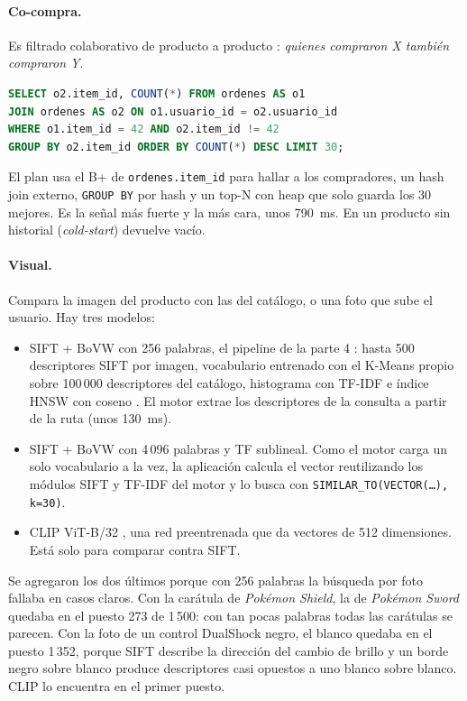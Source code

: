 \paragraph{Co-compra.} Es filtrado colaborativo de producto a producto \citep{linden}: \emph{quienes compraron X también compraron Y}.
\begin{lstlisting}[language=SQL]
SELECT o2.item_id, COUNT(*) FROM ordenes AS o1
JOIN ordenes AS o2 ON o1.usuario_id = o2.usuario_id
WHERE o1.item_id = 42 AND o2.item_id != 42
GROUP BY o2.item_id ORDER BY COUNT(*) DESC LIMIT 30;
\end{lstlisting}
El plan usa el B+ de \texttt{ordenes.item\_id} para hallar a los compradores, un hash join externo, \texttt{GROUP BY} por hash y un top-N con heap que solo guarda los 30 mejores. Es la señal más fuerte y la más cara, unos 790~ms. En un producto sin historial (\emph{cold-start}) devuelve vacío.

\paragraph{Visual.} Compara la imagen del producto con las del catálogo, o una foto que sube el usuario. Hay tres modelos:
\begin{itemize}
  \item SIFT + BoVW con 256 palabras, el pipeline de la parte 4 \citep{lowe,sivic}: hasta 500 descriptores SIFT por imagen, vocabulario entrenado con el K-Means propio sobre 100\,000 descriptores del catálogo, histograma con TF-IDF e índice HNSW con coseno \citep{hnsw}. El motor extrae los descriptores de la consulta a partir de la ruta (unos 130~ms).
  \item SIFT + BoVW con 4\,096 palabras y TF sublineal. Como el motor carga un solo vocabulario a la vez, la aplicación calcula el vector reutilizando los módulos SIFT y TF-IDF del motor y lo busca con \texttt{SIMILAR\_TO(VECTOR(\ldots), k=30)}.
  \item CLIP ViT-B/32 \citep{clip}, una red preentrenada que da vectores de 512 dimensiones. Está solo para comparar contra SIFT.
\end{itemize}
Se agregaron los dos últimos porque con 256 palabras la búsqueda por foto fallaba en casos claros. Con la carátula de \emph{Pokémon Shield}, la de \emph{Pokémon Sword} quedaba en el puesto 273 de 1\,500: con tan pocas palabras todas las carátulas se parecen. Con la foto de un control DualShock negro, el blanco quedaba en el puesto 1\,352, porque SIFT describe la dirección del cambio de brillo y un borde negro sobre blanco produce descriptores casi opuestos a uno blanco sobre blanco. CLIP lo encuentra en el primer puesto.

